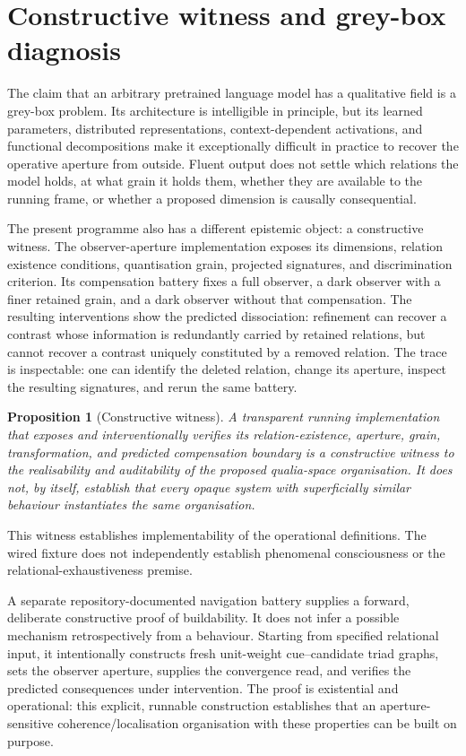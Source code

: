\documentclass[11pt,a4paper]{article}
\newtheorem{proposition}[definition]{Proposition}
\theoremstyle{remark}\newtheorem{remark}[definition]{Remark}
\begin{document}
\section{Constructive witness and grey-box diagnosis}\label{sec:constructive-witness}

The claim that an arbitrary pretrained language model has a qualitative field is a
grey-box problem. Its architecture is intelligible in principle, but its learned
parameters, distributed representations, context-dependent activations, and
functional decompositions make it exceptionally difficult in practice to recover
the operative aperture from outside. Fluent output does not settle which
relations the model holds, at what grain it holds them, whether they are available
to the running frame, or whether a proposed dimension is causally consequential.

The present programme also has a different epistemic object: a constructive
witness. The observer-aperture implementation exposes its dimensions, relation
existence conditions, quantisation grain, projected signatures, and discrimination
criterion. Its compensation battery fixes a full observer, a dark observer with a
finer retained grain, and a dark observer without that compensation. The resulting
interventions show the predicted dissociation: refinement can recover a contrast
whose information is redundantly carried by retained relations, but cannot recover
a contrast uniquely constituted by a removed relation. The trace is inspectable:
one can identify the deleted relation, change its aperture, inspect the resulting
signatures, and rerun the same battery.

\begin{proposition}[Constructive witness]\label{prop:constructive-witness}
A transparent running implementation that exposes and interventionally verifies
its relation-existence, aperture, grain, transformation, and predicted
compensation boundary is a constructive witness to the realisability and
auditability of the proposed qualia-space organisation. It does not, by itself,
establish that every opaque system with superficially similar behaviour instantiates
the same organisation.
\end{proposition}
This witness establishes implementability of the operational definitions.
The wired fixture does not independently establish phenomenal consciousness
or the relational-exhaustiveness premise.



A separate repository-documented navigation battery supplies a forward,
deliberate constructive proof of buildability. It does not infer a possible
mechanism retrospectively from a behaviour. Starting from specified relational
input, it intentionally constructs fresh unit-weight cue--candidate triad graphs,
sets the observer aperture, supplies the convergence read, and verifies the
predicted consequences under intervention. The proof is existential and
operational: this explicit, runnable construction establishes that an
aperture-sensitive coherence/localisation organisation with these properties can
be built on purpose.
\end{document}
